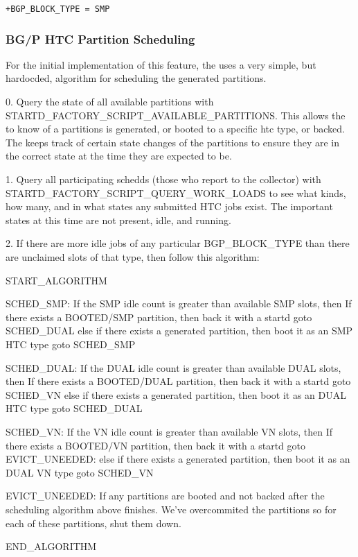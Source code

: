 \begin{verbatim}
+BGP_BLOCK_TYPE = SMP
\end{verbatim}

\subsubsection{BG/P HTC Partition Scheduling}

For the initial implementation of this feature, the
 uses a very simple, but hardocded, algorithm
for scheduling the generated partitions.

0. Query the state of all available partitions with
STARTD_FACTORY_SCRIPT_AVAILABLE_PARTITIONS. This allows the
 to know of a partitions is generated, or booted
to a specific htc type, or backed. The  keeps
track of certain state changes of the partitions to ensure they are in
the correct state at the time they are expected to be.

1. Query all participating schedds (those who report to the collector)
with STARTD_FACTORY_SCRIPT_QUERY_WORK_LOADS to see what kinds, how many,
and in what states any submitted HTC jobs exist. The important states
at this time are not present, idle, and running.

2. If there are more idle jobs of any particular BGP_BLOCK_TYPE than there
are unclaimed slots of that type, then follow this algorithm:

	START_ALGORITHM

	SCHED_SMP:
		If the SMP idle count is greater than available SMP slots, then
			If there exists a BOOTED/SMP partition, then
				back it with a startd
				goto SCHED_DUAL
			else if there exists a generated partition, then
				boot it as an SMP HTC type
				goto SCHED_SMP
	
	SCHED_DUAL:
		If the DUAL idle count is greater than available DUAL slots, then
			If there exists a BOOTED/DUAL partition, then
				back it with a startd
				goto SCHED_VN
			else if there exists a generated partition, then
				boot it as an DUAL HTC type
				goto SCHED_DUAL

	SCHED_VN:
		If the VN idle count is greater than available VN slots, then
			If there exists a BOOTED/VN partition, then
				back it with a startd
				goto EVICT_UNEEDED:
			else if there exists a generated partition, then
				boot it as an DUAL VN type
				goto SCHED_VN
				
	EVICT_UNEEDED:
		If any partitions are booted and not backed after the scheduling
		algorithm above finishes. We've overcommited the partitions so
		for each of these partitions, shut them down.

	END_ALGORITHM



